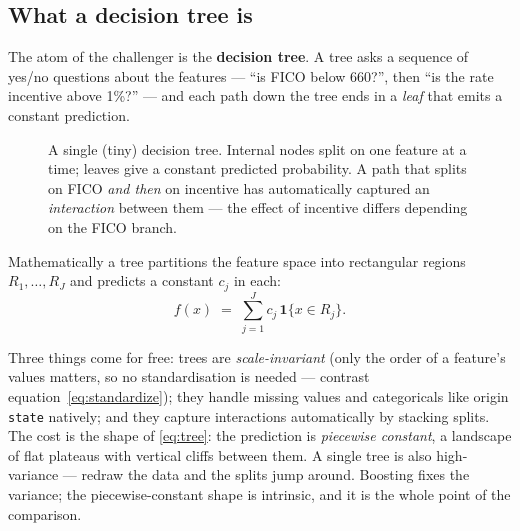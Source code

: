 \documentclass[11pt]{article}
\begin{document}
\subsection{What a decision tree is}

The atom of the challenger is the \textbf{decision tree}. A tree asks a sequence of yes/no
questions about the features --- ``is FICO below 660?'', then ``is the rate incentive above
1\%?'' --- and each path down the tree ends in a \emph{leaf} that emits a constant prediction.

\begin{figure}[H]
\centering
{}
\caption{A single (tiny) decision tree. Internal nodes split on one feature at a time; leaves
give a constant predicted probability. A path that splits on FICO \emph{and then} on incentive
has automatically captured an \emph{interaction} between them --- the effect of incentive differs
depending on the FICO branch.}
\end{figure}

Mathematically a tree partitions the feature space into rectangular regions $R_1,\dots,R_J$ and
predicts a constant $c_j$ in each:
\begin{equation}
  f(x) \;=\; \sum_{j=1}^{J} c_j\, \mathbf{1}\{x \in R_j\}.
  \label{eq:tree}
\end{equation}

\begin{intuition}
Three things come for free: trees are \emph{scale-invariant} (only the order of a feature's
values matters, so no standardisation is needed --- contrast equation~\eqref{eq:standardize});
they handle missing values and categoricals like origin \texttt{state} natively; and they
capture interactions automatically by stacking splits. The cost is the shape of
\eqref{eq:tree}: the prediction is \emph{piecewise constant}, a landscape of flat plateaus with
vertical cliffs between them. A single tree is also high-variance --- redraw the data and the
splits jump around. Boosting fixes the variance; the piecewise-constant shape is intrinsic, and
it is the whole point of the comparison.
\end{intuition}
\end{document}
